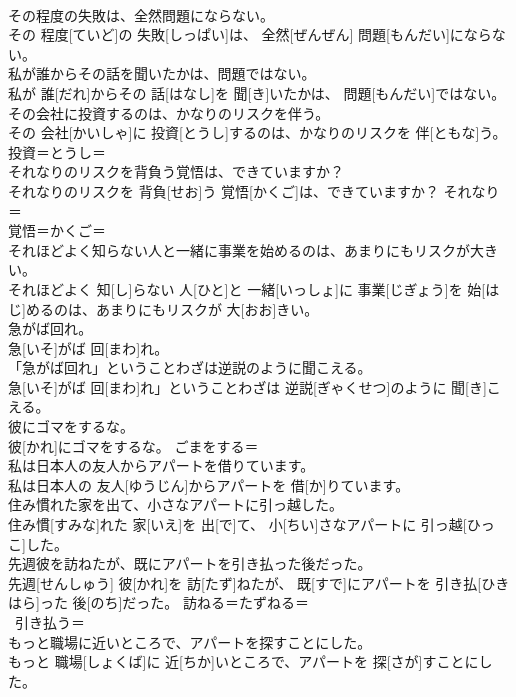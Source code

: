 \documentclass[8pt]{extreport}
\begin{document}
\begin{CJK}{UTF8}{min}
\\	その程度の失敗は、全然問題にならない。	
\\	その 程度[ていど]の 失敗[しっぱい]は、 全然[ぜんぜん] 問題[もんだい]にならない。	
\\	私が誰からその話を聞いたかは、問題ではない。	
\\	私が 誰[だれ]からその 話[はなし]を 聞[き]いたかは、 問題[もんだい]ではない。	
\\	その会社に投資するのは、かなりのリスクを伴う。	
\\	その 会社[かいしゃ]に 投資[とうし]するのは、かなりのリスクを 伴[ともな]う。	投資＝とうし＝ 
\\	それなりのリスクを背負う覚悟は、できていますか？	
\\	それなりのリスクを 背負[せお]う 覚悟[かくご]は、できていますか？	それなり＝ 
\\	覚悟＝かくご＝ 
\\	それほどよく知らない人と一緒に事業を始めるのは、あまりにもリスクが大きい。	
\\	それほどよく 知[し]らない 人[ひと]と 一緒[いっしょ]に 事業[じぎょう]を 始[はじ]めるのは、あまりにもリスクが 大[おお]きい。	
\\	急がば回れ。	
\\	急[いそ]がば 回[まわ]れ。	
\\	「急がば回れ」ということわざは逆説のように聞こえる。	
\\	急[いそ]がば 回[まわ]れ」ということわざは 逆説[ぎゃくせつ]のように 聞[き]こえる。	
\\	彼にゴマをするな。	
\\	彼[かれ]にゴマをするな。	ごまをする＝ 
\\	私は日本人の友人からアパートを借りています。	
\\	私は日本人の 友人[ゆうじん]からアパートを 借[か]りています。	
\\	住み慣れた家を出て、小さなアパートに引っ越した。	
\\	住み慣[すみな]れた 家[いえ]を 出[で]て、 小[ちい]さなアパートに 引っ越[ひっこ]した。	
\\	先週彼を訪ねたが、既にアパートを引き払った後だった。	
\\	先週[せんしゅう] 彼[かれ]を 訪[たず]ねたが、 既[すで]にアパートを 引き払[ひきはら]った 後[のち]だった。	訪ねる＝たずねる＝ 
\\	~引き払う＝ 
\\	もっと職場に近いところで、アパートを探すことにした。	
\\	もっと 職場[しょくば]に 近[ちか]いところで、アパートを 探[さが]すことにした。	

\end{CJK}
\end{document}
